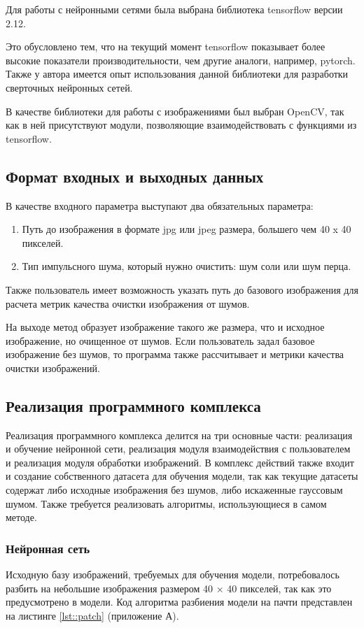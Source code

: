 Для работы с нейронными сетями была выбрана библиотека tensorflow версии 2.12.

Это обусловлено тем, что на текущий момент tensorflow показывает более высокие показатели производительности, чем другие аналоги, например, pytorch.
Также у автора имеется опыт использования данной библиотеки для разработки сверточных нейронных сетей.

В качестве библиотеки для работы с изображениями был выбран OpenCV, так как в ней присутствуют модули, позволяющие взаимодействовать с функциями из tensorflow.

\subsection{Формат входных и выходных данных}
В качестве входного параметра выступают два обязательных параметра:
\begin{enumerate}
	\item Путь до изображения в формате jpg или jpeg размера, большего чем 40 x 40 пикселей.
	\item Тип импульсного шума, который нужно очистить: шум соли или шум перца.
\end{enumerate}

Также пользователь имеет возможность указать путь до базового изображения для расчета метрик качества очистки изображения от шумов.

На выходе метод образует изображение такого же размера, что и исходное изображение, но очищенное от шумов.
Если пользователь задал базовое изображение без шумов, то программа также рассчитывает и метрики качества очистки изображений.

\subsection{Реализация программного комплекса}
Реализация программного комплекса делится на три основные части: реализация и обучение нейронной сети, реализация модуля взаимодействия с пользователем и реализация модуля обработки изображений. 
В комплекс действий также входит и создание собственного датасета для обучения модели, так как текущие датасеты содержат либо исходные изображения без шумов, либо искаженные гауссовым шумом.
Также требуется реализовать алгоритмы, использующиеся в самом методе.

\subsubsection{Нейронная сеть}
Исходную базу изображений, требуемых для обучения модели, потребовалось разбить на небольшие изображения размером 40 × 40 пикселей, так как это предусмотрено в модели. 
Код алгоритма разбиения модели на пачти представлен на листинге \ref{lst::patch} (приложение А).

